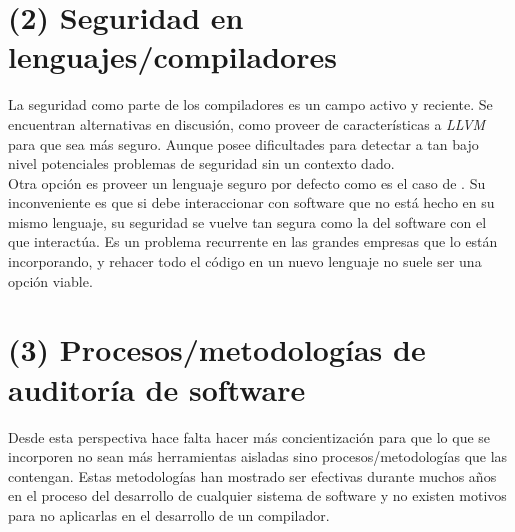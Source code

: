 \section{(2) Seguridad en lenguajes/compiladores}
La seguridad como parte de los compiladores es un campo activo y reciente. Se encuentran alternativas en discusión, como proveer de características a \textit{LLVM}\cite{EbecosmCompilation}\cite{EbecosmSecurityCompilers} para que sea más seguro. Aunque posee dificultades para detectar a tan bajo nivel potenciales problemas de seguridad sin un contexto dado.\\

Otra opción es proveer un lenguaje seguro por defecto como es el caso de    . Su inconveniente es que si debe interaccionar con software que no está hecho en su mismo lenguaje, su seguridad se vuelve tan segura como la del software con el que interactúa. Es un problema recurrente en las grandes empresas que lo están incorporando, y rehacer todo el código en un nuevo lenguaje no suele ser una opción viable.\\

\section{(3) Procesos/metodologías de auditoría de software}
Desde esta perspectiva hace falta hacer más concientización para que lo que se incorporen no sean más herramientas aisladas sino procesos/metodologías que las contengan. Estas metodologías han mostrado ser efectivas durante muchos años en el proceso del desarrollo de cualquier sistema de software y no existen motivos para no aplicarlas en el desarrollo de un compilador. 
